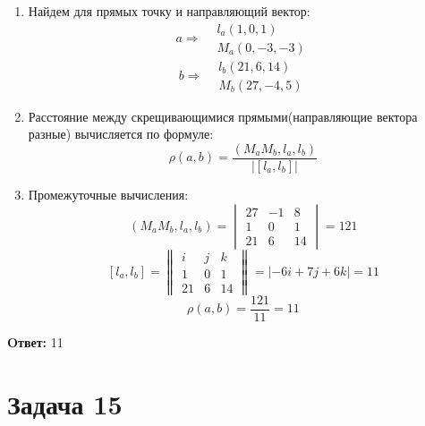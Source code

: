 \documentclass{article}
\begin{document}
\begin{enumerate}
  \item Найдем для прямых точку и направляющий вектор:
    \[
      a\Rightarrow \begin{aligned}
        &l_a(1,0,1)\\ 
        &M_a(0,-3,-3)
      \end{aligned}
    \]
    \[
      b\Rightarrow \begin{aligned}
        &l_b(21,6,14)\\ 
        &M_b(27,-4,5)
      \end{aligned}
    \]
  \item Расстояние между скрещивающимися прямыми(направляющие вектора разные) вычисляется по формуле:
    \[
      \rho(a,b) = \frac{(M_aM_b,l_a,l_b)}{|[l_a,l_b]|}
    \]
  \item Промежуточные вычисления:
    \[
      (M_aM_b,l_a,l_b) = \begin{vmatrix}
        27 &-1 &8\\
        1 &0 &1 \\ 
        21 &6 &14
      \end{vmatrix} = 121
    \]
    \[
      [l_a,l_b] = \begin{Vmatrix}
        i &j &k\\ 
        1 &0 &1\\ 
        21 &6 &14
      \end{Vmatrix} =| -6i +7j +6k| = 11  
    \]
    \[
      \rho(a,b) = \frac{121}{11} = 11
    \]
\end{enumerate}

\textbf{Oтвет: }11 
\section*{Задача 15}
\end{document}
